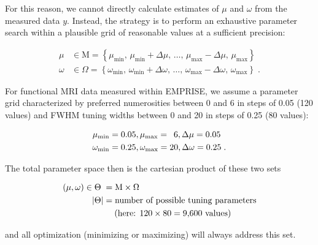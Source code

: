 \documentclass[a4paper,12pt]{article}
\begin{document}
For this reason, we cannot directly calculate estimates of $\mu$ and $\omega$ from the measured data $y$. Instead, the strategy is to perform an exhaustive parameter search within a plausible grid of reasonable values at a sufficient precision:

\vspace{-0.5em}
\begin{equation} \label{eq:fgs}
\begin{split}
\mu &\in \mathrm{M} = \left\lbrace \mu_\mathrm{min}, \, \mu_\mathrm{min} + \Delta \mu, \, \ldots, \, \mu_\mathrm{max} - \Delta \mu, \, \mu_\mathrm{max} \right\rbrace \\
\omega &\in \Omega = \left\lbrace \omega_\mathrm{min}, \, \omega_\mathrm{min} + \Delta \omega, \, \ldots, \, \omega_\mathrm{max} - \Delta \omega, \, \omega_\mathrm{max} \right\rbrace \; .
\end{split}
\end{equation}

For functional MRI data measured within EMPRISE, we assume a parameter grid characterized by preferred numerosities between 0 and 6 in steps of 0.05 (120 values) and FWHM tuning widths between 0 and 20 in steps of 0.25 (80 values):

\vspace{-0.5em}
\begin{equation} \label{eq:fgs-EMPRISE}
\begin{split}
\mu_\mathrm{min} &= 0.05, \mu_\mathrm{max} = \hphantom{2}6, \Delta \mu = 0.05 \\
\omega_\mathrm{min} &= 0.25, \omega_\mathrm{max} = 20, \Delta \omega = 0.25 \; .
\end{split}
\end{equation}

The total parameter space then is the cartesian product of these two sets

\vspace{-0.5em}
\begin{equation} \label{eq:Theta}
\begin{split}
(\mu,\omega) \in \Theta \hphantom{|} &= \mathrm{M} \times \Omega \\
|\Theta| &= \text{number of possible tuning parameters} \\
&\quad\; \text{(here: } 120 \times 80 = 9{,}600 \text{ values)}
\end{split}
\end{equation}

and all optimization (minimizing or maximizing) will always address this set.
\end{document}
